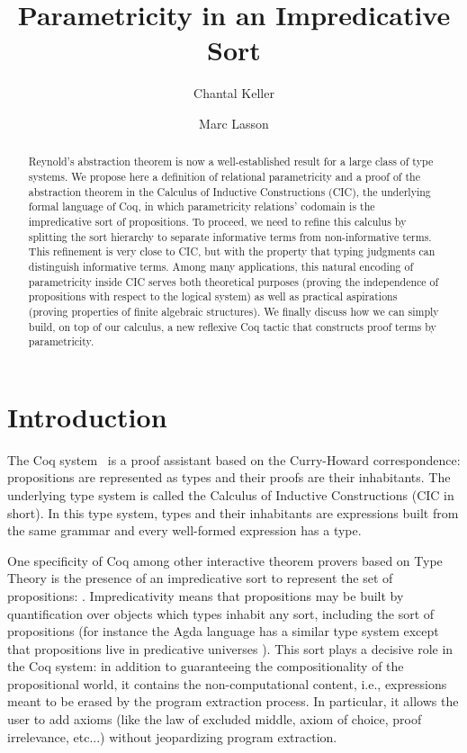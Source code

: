 \documentclass[a4paper,USenglish]{lipics}
\title{Parametricity in an Impredicative Sort}
\author[1]{Chantal Keller}
\author[2]{Marc Lasson}
\affil[1]{INRIA Saclay--Île-de-France at École Polytechnique\\
  \texttt{Chantal.Keller@inria.fr}}
\affil[2]{École Normale Supérieure de Lyon, Université de Lyon, LIP
\footnote{UMR 5668 CNRS ENS Lyon UCBL INRIA}
\\\texttt{marc.lasson@ens-lyon.org}}
\def\coq{\textsf{Coq}\xspace}
\def\cic{\textsf{CIC}\xspace}
\def\agda{\textsf{Agda}\xspace}
\begin{document}
\lstset{breaklines=true, xleftmargin=0.3cm, xrightmargin=0.3cm,
  breakatwhitespace=true, mathescape=true, basicstyle=\ttfamily,
  numbers=none, frame=none, language = Coq}

\maketitle

\begin{abstract}
  Reynold's abstraction theorem is now a well-established result for a
  large class of type systems. We propose here a definition of
  relational parametricity and a proof of the abstraction theorem in the
  Calculus of Inductive Constructions (\cic), the underlying formal language of
  \coq, in which parametricity relations' codomain is the impredicative
  sort of propositions. To proceed, we need to refine this calculus by
  splitting the sort hierarchy to separate informative terms from
  non-informative terms. This refinement is very close to \cic, but with
  the property that typing judgments can distinguish informative terms.
  Among many applications, this natural encoding of parametricity inside
  \cic serves both theoretical purposes (proving the independence of
  propositions with respect to the logical system) as well as practical
  aspirations (proving properties of finite algebraic structures). We
  finally discuss how we can simply build, on top of our calculus, a new
  reflexive \coq tactic that constructs proof terms by parametricity.
\end{abstract}

\EnableBpAbbreviations

\section{Introduction}

The \coq system~\cite{Coqdev11} is a proof assistant based on the
Curry-Howard correspondence: propositions are represented as types and
their proofs are their inhabitants. The underlying type system is called
the Calculus of Inductive Constructions (\cic in short). In this type
system, types and their inhabitants are expressions built from the same
grammar and every well-formed expression has a type.

One specificity of \coq among other interactive theorem provers based on Type
Theory is the presence of an impredicative sort to represent the set of
propositions: . Impredicativity means that propositions may be built
by quantification over objects which types inhabit any sort, including the
sort of propositions (for instance the \agda language has a similar type
system except that propositions live in predicative universes
\cite{norell07}). This sort plays a decisive role in the \coq system: in
addition to guaranteeing the compositionality of the propositional world, it
contains the non-computational content, i.e., expressions meant to be erased
by the program extraction process. In particular, it allows the user to add
axioms (like the law of excluded middle, axiom of choice, proof irrelevance,
etc...) without jeopardizing program extraction.
\end{document}
